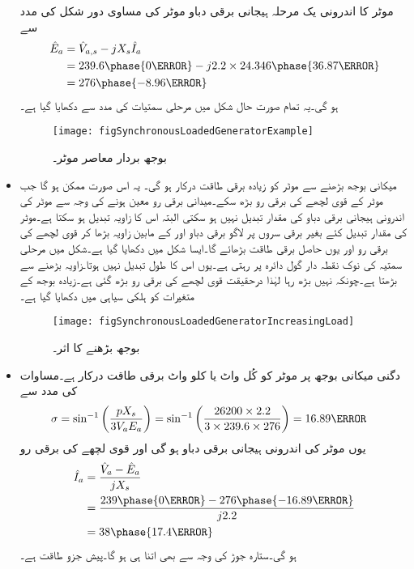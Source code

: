 \begin{itemize}
موٹر کا اندرونی یک مرحلہ ہیجانی برقی دباو موٹر کی مساوی دور شکل   کی مدد سے
\begin{align*}
\hat{E}_a&=\hat{V}_{a,s}- j X_s \hat{I}_a\\
&=239.6 \phase{0\degree}-j 2.2 \times 24.346 \phase{36.87\degree}\\
&=276 \phase{-8.96\degree}
\end{align*}
ہو گی۔یہ تمام صورت حال شکل   میں مرحلی سمتیات کی مدد سے دکھایا گیا ہے۔
\begin{figure}
\centering
\texttt{[image: figSynchronousLoadedGeneratorExample]}
\caption{بوجھ بردار معاصر موٹر۔}
\label{شکل_معاصر_بار_بردار_جنریٹر_مثال}
\end{figure}
%
\item
میکانی بوجھ بڑھنے سے موٹر کو زیادہ برقی طاقت درکار ہو گی۔ یہ اس صورت ممکن ہو گا جب موٹر کے قوی لچھے کی برقی رو بڑھ سکے۔میدانی برقی رو معین ہونے کی وجہ سے موٹر کی اندرونی ہیجانی برقی دباو  کی مقدار تبدیل نہیں ہو سکتی البتہ اس کا زاویہ تبدیل ہو سکتا ہے۔موٹر    کی مقدار تبدیل کئے بغیر  برقی سروں پر لاگو برقی دباو    اور   کے مابین زاویہ بڑھا کر قوی لچھے کی برقی رو اور یوں حاصل برقی طاقت بڑھائے گا۔ایسا شکل   میں دکھایا گیا ہے۔شکل میں  مرحلی سمتیہ کی نوک نقطہ دار گول دائرہ پر رہتی ہے۔یوں اس کا طول تبدیل نہیں ہوتا۔زاویہ بڑھنے سے  بڑھتا ہے۔چونکہ  نہیں بڑھ رہا لہٰذا درحقیقت قوی لچھے کی برقی رو بڑھ گئی ہے۔زیادہ بوجھ کے متغیرات کو ہلکی سیاہی میں دکھایا گیا ہے۔
\begin{figure}
\centering
\texttt{[image: figSynchronousLoadedGeneratorIncreasingLoad]}
\caption{بوجھ بڑھنے کا اثر۔}
\label{شکل_معاصر_بار_بڑھانے_کا_اثر}
\end{figure}
%
\item
دگنی میکانی بوجھ پر موٹر کو کُل   واٹ یا   کلو واٹ برقی طاقت درکار ہے۔مساوات   کی مدد سے
\begin{align*}
\sigma&=\sin^{-1} \left(\frac{p X_s}{3 V_a E_a} \right)=\sin^{-1} \left(\frac{26200 \times 2.2}{3\times 239.6 \times 276} \right)=16.89\degree
\end{align*}
یوں موٹر کی اندرونی ہیجانی برقی دباو  ہو گی اور قوی لچھے کی برقی رو
\begin{align*}
\hat{I}_a&=\frac{\hat{V}_a-\hat{E}_a}{j X_s}\\
&=\frac{239\phase{0\degree}-276\phase{-16.89\degree}}{j 2.2}\\
&=38\phase{17.4\degree}
\end{align*}
ہو گی۔ستارہ جوڑ کی وجہ سے  بھی اتنا ہی ہو گا۔پیش جزو طاقت  ہے۔
\end{itemize}
